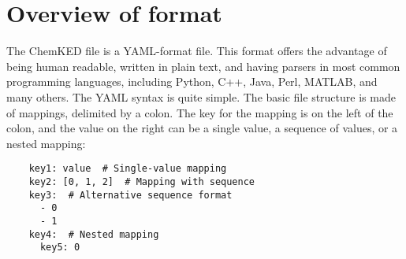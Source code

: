 \documentclass[12pt]{ussci}
\newcommand\ck{ChemKED}
\begin{document}
\section{Overview of format}\label{sec:overview-of-format}

The \ck{} file is a YAML-format file. This format offers the advantage of being
human readable, written in plain text, and having parsers in most common
programming languages, including Python, C++, Java, Perl, MATLAB, and many
others. The YAML syntax is quite simple. The basic file structure is made of
mappings, delimited by a colon. The key for the mapping is on the left of the
colon, and the value on the right can be a single value, a sequence of values, or a nested mapping:

\begin{verbatim}
    key1: value  # Single-value mapping
    key2: [0, 1, 2]  # Mapping with sequence
    key3:  # Alternative sequence format
      - 0
      - 1
    key4:  # Nested mapping
      key5: 0
\end{verbatim}
\end{document}
